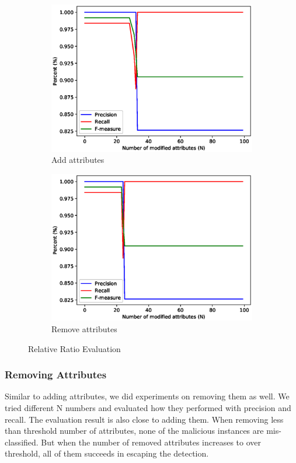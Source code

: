 \documentclass[11pt]{article}
\begin{document}
\begin{figure}[htbp]
\centering

\begin{subfigure}[htbp]{0.48\columnwidth}
\includegraphics*[width=\textwidth]{fig/addattrPR.eps}
\caption{Add attributes}
\label{fig:add}
\end{subfigure}
\hfill
\begin{subfigure}[htbp]{0.48\columnwidth}
\includegraphics*[width=\textwidth]{fig/subattrPR.eps}
\caption{Remove attributes}
\label{fig:sub}
\end{subfigure}
\caption{Relative Ratio Evaluation}
\label{fig:RRevaluation}
\end{figure}

\subsubsection{Removing Attributes}
Similar to adding attributes, we did experiments on removing them as well. We tried different N numbers and evaluated how they performed with precision and recall. The evaluation result is also close to adding them. When removing less than threshold number of attributes, none of the malicious instances are mis-classified. But when the number of removed attributes increases to over threshold, all of them succeeds in escaping the detection.
\end{document}
